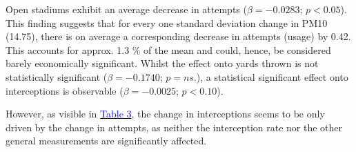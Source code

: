 \documentclass[12pt,a4paper]{article}
\newcommand{\mylink}[2]{\hyperref[#1]{\textcolor{blue}{#2}}}
\begin{document}
{\noindent Open stadiums exhibit an average decrease in attempts ($\beta = -0.0283$; $p < 0.05$). This finding suggests that for every one standard deviation change in PM10 (14.75), there is on average a corresponding decrease in attempts (usage) by 0.42. This accounts for approx. 1.3 \% of the mean and could, hence, be considered barely economically significant. Whilst the effect onto yards thrown is not statistically significant ($\beta = -0.1740$; $p = ns.$), a statistical significant effect onto interceptions is observable ($\beta = -0.0025$; $p < 0.10$).

\clearpage
However, as visible in \mylink{T1}{Table 3}, the change in interceptions seems to be only driven by the change in attempts, as neither the interception rate nor the other general measurements are significantly affected.  

}
\end{document}
